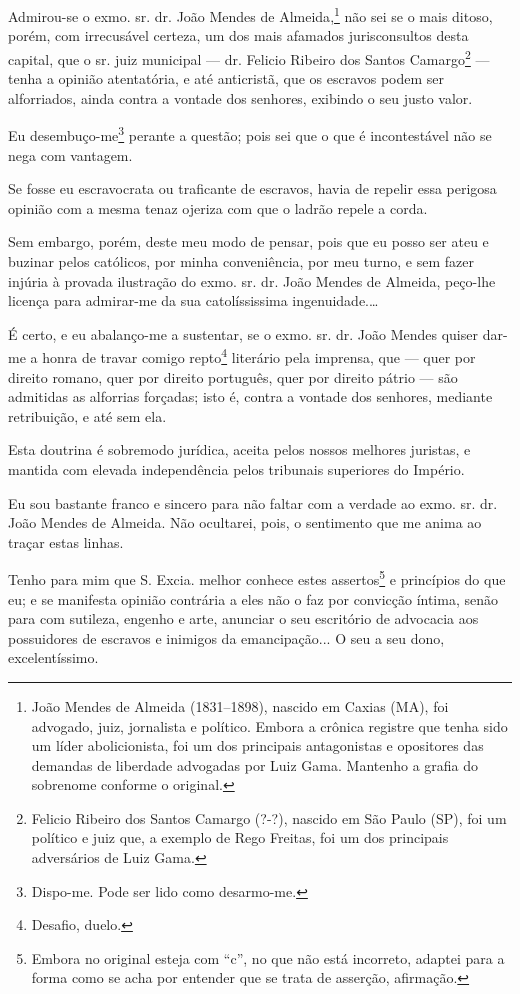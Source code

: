 {\asterisc{}

Admirou-se o exmo. sr. dr. João Mendes de
Almeida\textsuperscript{⁠},\footnote{ João Mendes de Almeida
  (1831--1898), nascido em Caxias (MA), foi advogado, juiz, jornalista e
  político. Embora a crônica registre que tenha sido um líder
  abolicionista, foi um dos principais antagonistas e opositores das
  demandas de liberdade advogadas por Luiz Gama. Mantenho a grafia do
  sobrenome conforme o original.} não sei se o mais ditoso, porém, com
irrecusável certeza, um dos mais afamados jurisconsultos desta capital,
que o sr. juiz municipal --- dr. Felicio Ribeiro dos Santos
Camargo\footnote{ Felicio Ribeiro dos Santos Camargo (?-?), nascido
  em São Paulo (SP), foi um político e juiz que, a exemplo de Rego
  Freitas, foi um dos principais adversários de Luiz Gama.} --- tenha a
opinião atentatória, e até anticristã, que os escravos podem ser
alforriados, ainda contra a vontade dos senhores, exibindo o seu justo
valor.

Eu desembuço-me\footnote{ Dispo-me. Pode ser lido como desarmo-me.}
perante a questão; pois sei que o que é incontestável não se nega com
vantagem.

Se fosse eu escravocrata ou traficante de escravos, havia de repelir
essa perigosa opinião com a mesma tenaz ojeriza com que o ladrão repele
a corda.

Sem embargo, porém, deste meu modo de pensar, pois que eu posso ser ateu
e buzinar pelos católicos, por minha conveniência, por meu turno, e sem
fazer injúria à provada ilustração do exmo. sr. dr. João Mendes de
Almeida, peço-lhe licença para admirar-me da sua catolíssissima
ingenuidade.\ldots{}

É certo, e eu abalanço-me a sustentar, se o exmo. sr. dr. João Mendes
quiser dar-me a honra de travar comigo repto\footnote{ Desafio,
  duelo.} literário pela imprensa, que --- quer por direito romano, quer
por direito português, quer por direito pátrio --- são admitidas as
alforrias forçadas; isto é, contra a vontade dos senhores, mediante
retribuição, e até sem ela.

Esta doutrina é sobremodo jurídica, aceita pelos nossos melhores
juristas, e mantida com elevada independência pelos tribunais superiores
do Império.

Eu sou bastante franco e sincero para não faltar com a verdade ao exmo.
sr. dr. João Mendes de Almeida. Não ocultarei, pois, o sentimento que me
anima ao traçar estas linhas.

Tenho para mim que S. Excia. melhor conhece estes assertos\footnote{
  Embora no original esteja com ``c'', no que não está incorreto,
  adaptei para a forma como se acha por entender que se trata de
  asserção, afirmação.} e princípios do que eu; e se manifesta opinião
contrária a eles não o faz por convicção íntima, senão para com
sutileza, engenho e arte, anunciar o seu escritório de advocacia aos
possuidores de escravos e inimigos da emancipação... O seu a seu dono,
excelentíssimo.

}
